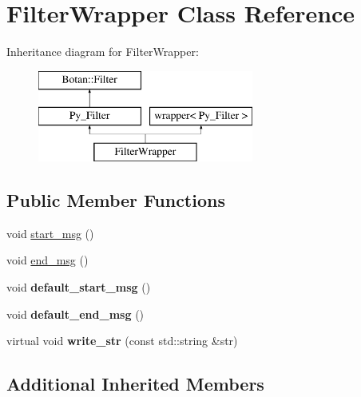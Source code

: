 \hypertarget{classFilterWrapper}{\section{Filter\-Wrapper Class Reference}
\label{classFilterWrapper}
}
Inheritance diagram for Filter\-Wrapper\-:\begin{figure}[H]
\begin{center}
\leavevmode
\includegraphics[height=3.000000cm]{classFilterWrapper}
\end{center}
\end{figure}
\subsection*{Public Member Functions}
\begin{DoxyCompactItemize}
\item 
void \hyperlink{classFilterWrapper_a9fd6465040bf01cf7e9a2c60d9481c38}{start\-\_\-msg} ()
\item 
void \hyperlink{classFilterWrapper_a625394e5e352a4973cf62ef20a07f660}{end\-\_\-msg} ()
\item 
\hypertarget{classFilterWrapper_a1ad1e2f34dff98b3f3497c8b29653f52}{void {\bfseries default\-\_\-start\-\_\-msg} ()}\label{classFilterWrapper_a1ad1e2f34dff98b3f3497c8b29653f52}

\item 
\hypertarget{classFilterWrapper_a5cc2e7a27d437b16d7c619c0cb5126bf}{void {\bfseries default\-\_\-end\-\_\-msg} ()}\label{classFilterWrapper_a5cc2e7a27d437b16d7c619c0cb5126bf}

\item 
\hypertarget{classFilterWrapper_ad6ceab3ab8994bf7a20f593507b46fc2}{virtual void {\bfseries write\-\_\-str} (const std\-::string \&str)}\label{classFilterWrapper_ad6ceab3ab8994bf7a20f593507b46fc2}

\end{DoxyCompactItemize}
\subsection*{Additional Inherited Members}


